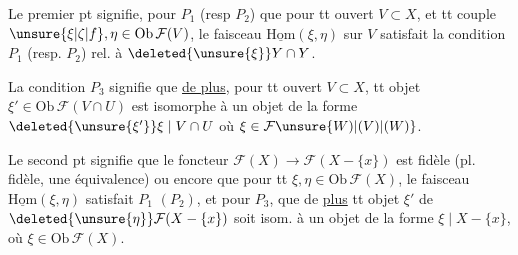 
Le premier pt signifie, pour $P_1$ (resp $P_2$) que pour tt ouvert $V\subset X$, et tt couple $\unsure{\xi|\zeta|f},\eta\in\mathrm{Ob}\,\mathcal F(V)$, le faisceau $\underline{\mathrm{Hom}}(\xi,\eta)$ sur $V$ satisfait la condition $P_1$ (resp. $P_2$) rel. à $\deleted{\unsure{\xi}}Y\cap Y$.

La condition $P_3$ signifie que \uline{de plus}, pour tt ouvert $V\subset X$,  tt objet $\xi'\in\mathrm{Ob}\,\mathcal F(V\cap U)$ est isomorphe à un objet de la forme $\deleted{\unsure{\xi'}}\xi\mid V\cap U$ où $\xi\in\mathcal F\unsure{W)|(V)|(W)}$.

Le second pt signifie que le foncteur $\mathcal F(X)\longrightarrow\mathcal F(X-\{x\})$ est fidèle  (pl. fidèle, une équivalence)  ou encore  que pour tt $\xi,\eta\in\mathrm{Ob}\,\mathcal F(X)$, le faisceau $\underline{\mathrm{Hom}}(\xi,\eta)$ satisfait $P_1$ $(P_2)$, et pour $P_3$, que de \uline{plus} tt objet  $\xi'$ de $\deleted{\unsure{\eta}}\mathcal F(X-\{x\})$ soit isom. à un objet de la forme  $\xi\mid X-\{x\}$, où $\xi\in\mathrm{Ob}\,\mathcal F(X)$.

